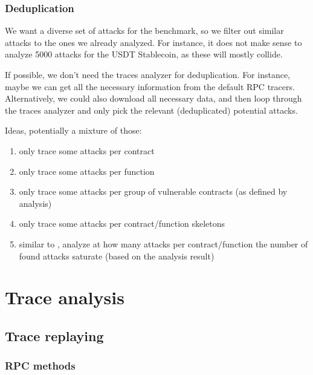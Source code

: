 \documentclass[draft,final]{vutinfth} %
\begin{document}
\subsection{Deduplication}

We want a diverse set of attacks for the benchmark, so we filter out similar attacks to the ones we already analyzed. For instance, it does not make sense to analyze 5000 attacks for the USDT Stablecoin, as these will mostly collide.

If possible, we don't need the traces analyzer for deduplication. For instance, maybe we can get all the necessary information from the default RPC tracers.
Alternatively, we could also download all necessary data, and then loop through the traces analyzer and only pick the relevant (deduplicated) potential attacks.

Ideas, potentially a mixture of those:

\begin{enumerate}
    \item only trace some attacks per contract
    \item only trace some attacks per function
    \item only trace some attacks per group of vulnerable contracts (as defined by analysis)
    \item only trace some attacks per contract/function skeletons
    \item similar to \cite{}, analyze at how many attacks per contract/function the number of found attacks saturate (based on the analysis result)
\end{enumerate}

\chapter{Trace analysis}


\section{Trace replaying}

\subsection{RPC methods}
\end{document}
